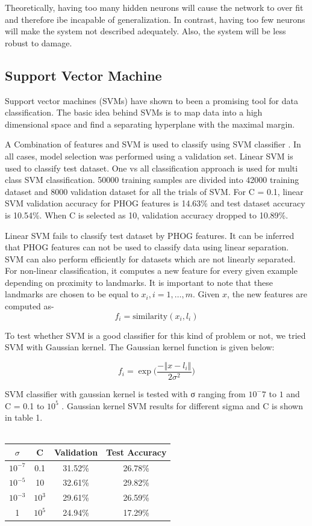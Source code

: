 \documentclass[10pt,twocolumn]{article}
\begin{document}
Theoretically, having too many hidden neurons will cause the network to over fit and therefore ibe incapable of generalization. In contrast, having too few neurons will make the system not described adequately. Also, the system will be less robust to damage.

\subsection{Support Vector Machine}
Support vector machines (SVMs) have shown to been a promising tool for data classification. The basic idea behind SVMs is to map data into a high dimensional space and find a separating hyperplane with the maximal margin.

A Combination of features and SVM is used to classify using SVM classifier \cite {chen2006combining}. In all cases, model selection was performed using a validation set. Linear SVM is used to classify test dataset. One vs all classification approach is used for multi class SVM classification. 50000 training samples are divided into 42000 training dataset and 8000 validation dataset for all the trials of SVM. For C = 0.1, linear SVM validation accuracy for PHOG features is 14.63\% and test dataset accuracy is 10.54\%.  When C is selected as 10, validation accuracy dropped to 10.89\%.

Linear SVM fails to classify test dataset by PHOG features. It can be inferred that PHOG features can not be used to classify data using linear separation.
SVM can also perform efficiently for datasets which are not linearly separated. For non-linear classification, it computes a new feature for every given example depending on proximity to landmarks. It is important to note that these landmarks are chosen to be equal to $x_i, i=1,…,m$. Given $x$, the new features are computed as-
\[f_i=\text{similarity}(x_i,l_i)\]
 
To test whether SVM is a good classifier for this kind of problem or not, we tried SVM with Gaussian kernel. The Gaussian kernel function is given below:

\[f_i=\exp\Big(\frac{-‖x-l_i ‖}{2\sigma^2 }\Big)\]

SVM classifier with gaussian kernel is tested with σ ranging from $10^-7$ to $1$ and C = 0.1 to $10^5$ \cite {larochelle2007empirical}. Gaussian kernel SVM results for different sigma and C is shown in table 1. 
\\
\\
\begin{tabular}{|c|c|c|c|}
\hline
$\sigma$ & C &	Validation & Test Accuracy \\
\hline
$10^{-7}$  & 0.1	& 31.52\%	& 26.78\% \\
$10^{-5}$	 & 10	& 32.61\%	& 29.82\% \\
$10^{-3}$	 & $10^3$ & 29.61\%	& 26.59\% \\
1        &$10^5$ & 	24.94\% & 	17.29\% \\
\hline
\end{tabular}
\\
\end{document}
